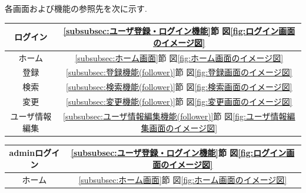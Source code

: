 \documentclass[11ptm]{jsarticle}
\begin{document}
各画面および機能の参照先を次に示す. \\
\begin{minipage}[t]{0.5\linewidth}
  \vspace{1zh}
  \begin{center}
    \begin{tabular}{c|c}
       ログイン & \ref{subsubsec:ユーザ登録・ログイン機能}節 図\ref{fig:ログイン画面のイメージ図} \\
       \hline
       ホーム & \ref{subsubsec:ホーム画面}節 図\ref{fig:ホーム画面のイメージ図} \\
       \hline
       登録 & \ref{subsubsec:登録機能(follower)}節 図\ref{fig:登録画面のイメージ図} \\
       \hline
       検索 & \ref{subsubsec:検索機能(follower)}節 図\ref{fig:検索画面のイメージ図} \\
       \hline
       変更 & \ref{subsubsec:変更機能(follower)}節 図\ref{fig:変更画面のイメージ図} \\
       \hline
       ユーザ情報編集 & \ref{subsubsec:ユーザ情報編集機能(follower)}節 図\ref{fig:ユーザ情報編集画面のイメージ図} \\
    \end{tabular}
  \end{center}
\end{minipage}
%
\hfill
%
\begin{minipage}[t]{0.5\linewidth}
  \vspace{1zh}
  \begin{center}
    \begin{tabular}{c|c}
       adminログイン & \ref{subsubsec:ユーザ登録・ログイン機能}節 図\ref{fig:ログイン画面のイメージ図} \\
       \hline
       ホーム & \ref{subsubsec:ホーム画面}節 図\ref{fig:ホーム画面のイメージ図} \\
    \end{tabular}
  \end{center}
\end{minipage}

\clearpage
\end{document}
